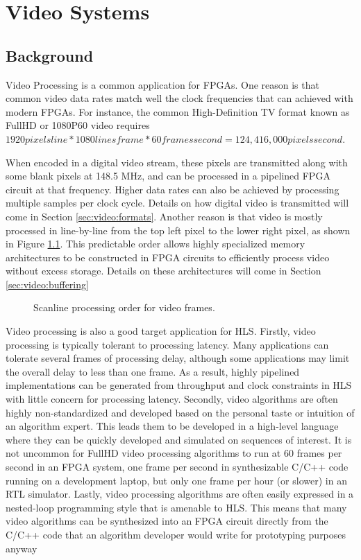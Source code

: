 
\chapter{Video Systems}
\glsresetall
\label{chapter:video}

\section{Background}
\label{chapVideo}
Video Processing is a common application for FPGAs.  One reason is that common video data rates match well the clock frequencies that can achieved with modern FPGAs.  For instance, the common High-Definition TV format known as FullHD or 1080P60 video requires
 $1920 \unit{pixels}{line} * 1080 \unit{lines}{frame} * 60 \unit{frames}{second} = 124,416,000 \unit{pixels}{second}$.  

When encoded in a digital video stream, these pixels are transmitted along with some blank pixels at 148.5 MHz, and can be processed in a pipelined FPGA circuit at that frequency.  Higher data rates can also be achieved by processing multiple samples per clock cycle.  Details on how digital video is transmitted will come in Section \ref{sec:video:formats}.  Another reason is that video is mostly processed in  line-by-line from the top left pixel to the lower right pixel, as shown in Figure \ref{fig:scanlineOrder}.  This predictable order allows highly specialized memory architectures to be constructed in FPGA circuits to efficiently process video without excess storage.  Details on these architectures will come in Section \ref{sec:video:buffering}

\begin{figure}
\centering

\caption{Scanline processing order for video frames.}\label{fig:scanlineOrder}
\end{figure}

Video processing is also a good target application for HLS.  Firstly, video processing is typically tolerant to processing latency.  Many applications can tolerate several frames of processing delay, although some applications may limit the overall delay to less than one frame.  As a result, highly pipelined implementations can be generated from throughput and clock constraints in HLS with little concern for processing latency.   Secondly, video algorithms are often highly non-standardized and developed based on the personal taste or intuition of an algorithm expert.  This leads them to be developed in a high-level language where they can be quickly developed and simulated on sequences of interest.  It is not uncommon for FullHD video processing algorithms to run at 60 frames per second in an FPGA system, one frame per second in synthesizable C/C++ code running on a development laptop, but only one frame per hour (or slower) in an RTL simulator.  Lastly, video processing algorithms are often easily expressed in a nested-loop programming style that is amenable to HLS.  This means that many video algorithms can be synthesized into an FPGA circuit directly from the C/C++ code that an algorithm developer would write for prototyping purposes anyway

